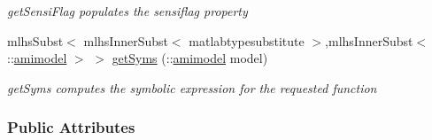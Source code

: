 \begin{DoxyCompactItemize}
\begin{DoxyCompactList}\small\item\em get\+Sensi\+Flag populates the sensiflag property \end{DoxyCompactList}\item 
mlhs\+Subst$<$ mlhs\+Inner\+Subst$<$ matlabtypesubstitute $>$,mlhs\+Inner\+Subst$<$\+::\mbox{\hyperlink{classamimodel}{amimodel}} $>$ $>$ \mbox{\hyperlink{classamifun_a44e49602645d85f94841f38e4673fa1a}{get\+Syms}} (\+::\mbox{\hyperlink{classamimodel}{amimodel}} model)
\begin{DoxyCompactList}\small\item\em get\+Syms computes the symbolic expression for the requested function \end{DoxyCompactList}\end{DoxyCompactItemize}
\subsubsection*{Public Attributes}
